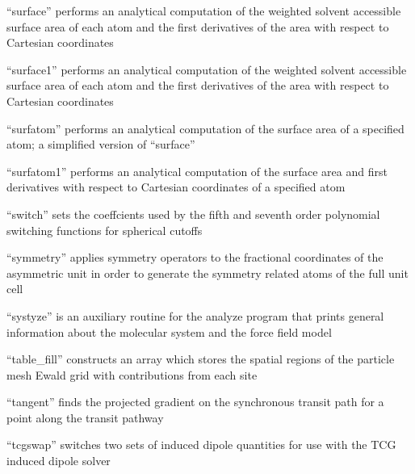 \documentclass[letterpaper,11pt,english]{sphinxmanual}
\begin{document}

“surface” performs an analytical computation of the weighted
solvent accessible surface area of each atom and the first
derivatives of the area with respect to Cartesian coordinates


“surface1” performs an analytical computation of the weighted
solvent accessible surface area of each atom and the first
derivatives of the area with respect to Cartesian coordinates


“surfatom” performs an analytical computation of the surface
area of a specified atom; a simplified version of “surface”


“surfatom1” performs an analytical computation of the surface
area and first derivatives with respect to Cartesian coordinates
of a specified atom


“switch” sets the coeffcients used by the fifth and seventh
order polynomial switching functions for spherical cutoffs


“symmetry” applies symmetry operators to the fractional
coordinates of the asymmetric unit in order to generate
the symmetry related atoms of the full unit cell


“systyze” is an auxiliary routine for the analyze program
that prints general information about the molecular system
and the force field model


“table\_fill” constructs an array which stores the spatial
regions of the particle mesh Ewald grid with contributions
from each site


“tangent” finds the projected gradient on the synchronous
transit path for a point along the transit pathway


“tcgswap” switches two sets of induced dipole quantities for
use with the TCG induced dipole solver
\end{document}
